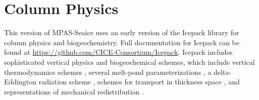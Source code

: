 \section{Column Physics}
\label{sec:column_physics}

This version of MPAS-Seaice uses an early version of the Icepack library for column physics and biogeochemistry. Full documentation for Icepack can be found at \url{https://github.com/CICE-Consortium/Icepack}. Icepack includes sophisticated vertical physics and biogeochemical schemes, which include vertical thermodynamics schemes \citep{BL99,Turner13,Turner15}, several melt-pond parameterizations \citep{Flocco10,Holland12,Hunke13}, a delta-Eddington radiation scheme \citep{Briegleb07,Holland12}, schemes for transport in thickness space \citep{Lipscomb01}, and representations of mechanical redistribution \citep{Lipscomb07}.
